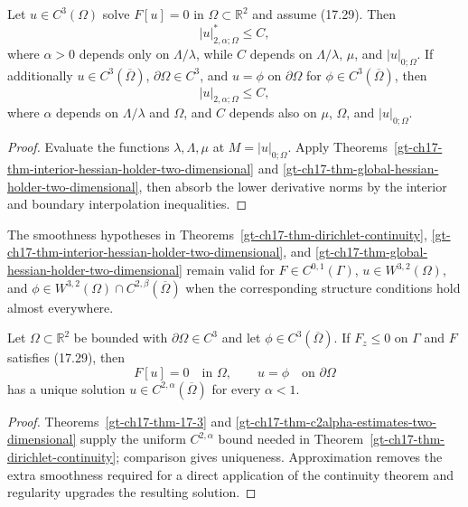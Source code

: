 \begin{theorem}
\label{gt-ch17-thm-c2alpha-estimates-two-dimensional}
Let $u\in C^3(\Omega)$ solve $F[u]=0$ in $\Omega\subset\mathbb R^2$ and
assume (17.29).  Then
\begin{equation}\tag{17.30}
|u|^*_{2,\alpha;\Omega}\le C,
\end{equation}
where $\alpha>0$ depends only on $\Lambda/\lambda$, while $C$ depends on
$\Lambda/\lambda$, $\mu$, and $|u|_{0;\Omega}$.
If additionally $u\in C^3(\overline\Omega)$, $\partial\Omega\in C^3$, and
$u=\phi$ on $\partial\Omega$ for $\phi\in C^3(\overline\Omega)$, then
\begin{equation}\tag{17.31}
|u|_{2,\alpha;\Omega}\le C,
\end{equation}
where $\alpha$ depends on $\Lambda/\lambda$ and $\Omega$, and $C$ depends
also on $\mu$, $\Omega$, and $|u|_{0;\Omega}$.
\end{theorem}
\begin{proof}
\sketch Evaluate the functions $\lambda,\Lambda,\mu$ at
$M=|u|_{0;\Omega}$.  Apply
Theorems~\ref{gt-ch17-thm-interior-hessian-holder-two-dimensional} and
\ref{gt-ch17-thm-global-hessian-holder-two-dimensional}, then absorb the lower
derivative norms by the interior and boundary interpolation inequalities.
\end{proof}

The smoothness hypotheses in Theorems~\ref{gt-ch17-thm-dirichlet-continuity},
\ref{gt-ch17-thm-interior-hessian-holder-two-dimensional}, and
\ref{gt-ch17-thm-global-hessian-holder-two-dimensional} remain valid for
$F\in C^{0,1}(\Gamma)$, $u\in W^{3,2}(\Omega)$, and
$\phi\in W^{3,2}(\Omega)\cap C^{2,\beta}(\overline\Omega)$ when the
corresponding structure conditions hold almost everywhere.

\begin{theorem}
\label{gt-ch17-thm-dirichlet-solvability-two-dimensional}
Let $\Omega\subset\mathbb R^2$ be bounded with $\partial\Omega\in C^3$ and
let $\phi\in C^3(\overline\Omega)$.  If $F_z\le0$ on $\Gamma$ and $F$
satisfies (17.29), then
\[
F[u]=0\quad\text{in }\Omega,
\qquad u=\phi\quad\text{on }\partial\Omega
\]
has a unique solution $u\in C^{2,\alpha}(\overline\Omega)$ for every
$\alpha<1$.
\end{theorem}
\begin{proof}
\sketch Theorems~\ref{gt-ch17-thm-17-3} and
\ref{gt-ch17-thm-c2alpha-estimates-two-dimensional} supply the uniform
$C^{2,\alpha}$ bound
needed in Theorem~\ref{gt-ch17-thm-dirichlet-continuity}; comparison gives
uniqueness.  Approximation removes
the extra smoothness required for a direct application of the continuity
theorem and regularity upgrades the resulting solution.
\end{proof}

